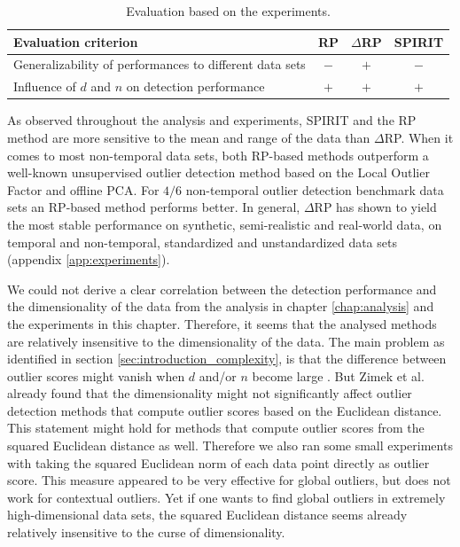 \begin{table}[h]
	\centering
	\vspace{0.1cm}
	\caption{Evaluation based on the experiments.}
	\label{tab:experiments_qualcomp}
	\begin{tabular}{l c c c}
		\toprule
		\textbf{Evaluation criterion} 		& \textbf{RP} 	& \textbf{$\Delta$RP} & \textbf{SPIRIT} \\ \midrule
		Generalizability of performances to different data sets  & $-$ & $+$	& $-$ \\[0.15cm]
		Influence of $d$ and $n$ on	detection performance & $+$ & $+$ & $+$ \\
		\bottomrule		
	\end{tabular}
	\vspace{0.1cm}
\end{table}
 
As observed throughout the analysis and experiments, SPIRIT and the RP method are more sensitive to the mean and range of the data than $\Delta$RP. When it comes to most non-temporal data sets, both RP-based methods outperform a well-known unsupervised outlier detection method based on the Local Outlier Factor and offline PCA. For $4/6$ non-temporal outlier detection benchmark data sets an RP-based method performs better.
In general, $\Delta$RP has shown to yield the most stable performance on synthetic, semi-realistic and real-world data, on temporal and non-temporal, standardized and unstandardized data sets (appendix \ref{app:experiments}).

We could not derive a clear correlation between the detection performance and the dimensionality of the data from the analysis in chapter \ref{chap:analysis} and the experiments in this chapter. Therefore, it seems that the analysed methods are relatively insensitive to the dimensionality of the data. The main problem as identified in section \ref{sec:introduction_complexity}, is that the difference between outlier scores might vanish when $d$ and/or $n$ become large \cite{beyer1999nearest}. But Zimek et al. \cite{zimek2012survey} already found that the dimensionality might not significantly affect outlier detection methods that compute outlier scores based on the Euclidean distance. This statement might hold for methods that compute outlier scores from the squared Euclidean distance as well. Therefore we also ran some small experiments with taking the squared Euclidean norm of each data point directly as outlier score. This measure appeared to be very effective for global outliers, but does not work for contextual outliers. Yet if one wants to find global outliers in extremely high-dimensional data sets, the squared Euclidean distance seems already relatively insensitive to the curse of dimensionality.


